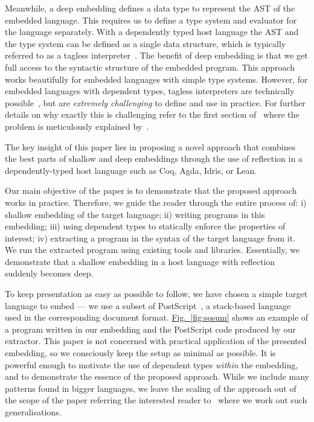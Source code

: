 \documentclass[sigplan,screen]{acmart}
\newcommand{\myref}[2]{\hyperref[#2]{#1~\ref*{#2}}}
\newcommand{\figref}[1]{\myref{Fig.}{fig:#1}}%
\begin{document}
Meanwhile, a deep embedding defines a data type to represent the AST
of the embedded language.  This requires us to define a type system
and evaluator for the language separately.  With a dependently typed
host language the AST and the type system can be defined as a single
data structure, which is typically referred to as a tagless
interpreter~\citep{PasalicTS02,Tagless}.  The benefit of deep embedding is that we get
full access to the syntactic structure of the embedded program.  This
approach works beautifully for embedded languages with simple type
systems. However, for embedded languages with dependent types, tagless
interpreters are technically
possible~\citep{CHAPMAN200921,10.1007/978-3-540-74464-1_7}, but are
\emph{extremely challenging} to define and use in practice.
For further details on why exactly this is challenging refer to the
first section of~\cite{10.1145/1863495.1863497} where the problem is meticulously
explained by~\citeauthor{10.1145/1863495.1863497}.

The key insight of this paper lies in proposing a novel approach that
combines the best parts of shallow and deep embeddings through the use
of reflection in a
dependently-typed host language such as Coq, Agda, Idris, or Lean.

Our main objective of the paper is to demonstrate that the
proposed approach works in practice.  Therefore, we guide the reader
through the entire process of: i) shallow embedding of the target
language;  ii) writing programs in this embedding; iii) using
dependent types to statically enforce the properties of interest;
iv) extracting a program in the syntax of the target language
from it.  We run the extracted program using existing
tools and libraries. Essentially, we demonstrate that a
shallow embedding in a host language with reflection
suddenly becomes deep.



To keep presentation as easy as possible to follow, we have
chosen a simple target language to embed --- we use a subset
of PostScript~\citep{postscript1999language}, a stack-based
language used in the corresponding document format.
%
\figref{sqsum} shows an example of a program
written in our embedding and the PostScript code produced by
our extractor.
%
This paper is not concerned with practical application of
the presented embedding, so we consciously keep the setup as minimal as
possible.  It is powerful enough to motivate the use of dependent
types \emph{within} the embedding, and to demonstrate the essence
of the proposed approach.  While we include many patterns found
in bigger languages, we leave the scaling of the approach out
of the scope of the paper referring the interested reader
to~\cite{DBLP:journals/corr/abs-2105-10819} where we work
out such generalisations.
\end{document}
